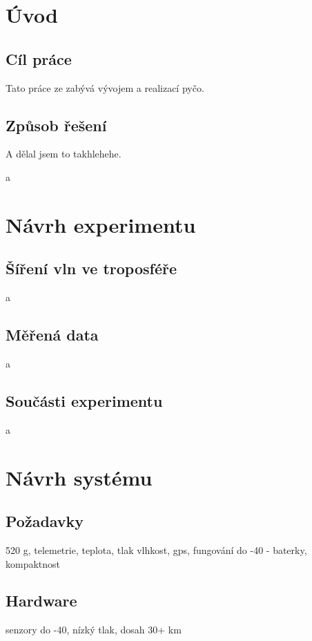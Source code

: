 \documentclass[twoside]{ctuthesis}
\theoremstyle{plain}
\theoremstyle{definition}
\theoremstyle{note}
\begin{document}
\maketitle

\chapter{Úvod}

\section{Cíl práce}

Tato práce ze zabývá vývojem a realizací pyčo.

\section{Způsob řešení}

A dělal jsem to takhlehehe.


a
\chapter{Návrh experimentu}


\section{Šíření vln ve troposféře}
a

\section{Měřená data}
a

\section{Součásti experimentu}
a

\chapter{Návrh systému}
\section{Požadavky}
520 g, telemetrie, teplota, tlak vlhkost, gps, fungování do -40 - baterky, kompaktnost
\section{Hardware}
senzory do -40, nízký tlak, dosah 30+ km
\end{document}
